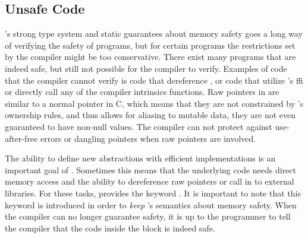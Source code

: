 
\subsection{Unsafe Code} %
\label{ssub:unsafe_code}

{\rust}'s strong type system and static guarantees about memory safety goes a long way of verifying the safety of programs, but for certain programs the restrictions set by the compiler might be too conservative.
There exist many programs that are indeed safe, but still not possible for the compiler to verify.
Examples of code that the compiler cannot verify is code that dereference , or code that utilize {\rust}'s \gls{ffi} or directly call any of the compiler intrinsics functions.
Raw pointers in {\rust} are similar to a normal pointer in C, which means that they are not constrained by {\rust}'s ownership rules, and thus allows for aliasing to mutable data, they are not even guaranteed to have non-null values.
The compiler can not protect against use-after-free errors or dangling pointers when raw pointers are involved.

The ability to define new abstractions with efficient implementations is an important goal of {\rust}.
Sometimes this means that the underlying code needs direct memory access and the ability to dereference raw pointers or call in to external libraries.
For these tasks, {\rust} provides the keyword {\unsafe}.
It is important to note that this {\unsafe} keyword is introduced in order to \emph{keep} {\rust}'s semantics about memory safety.
When the compiler can no longer guarantee safety, it is up to the programmer to tell the compiler that the code inside the {\unsafe} block is indeed safe.

